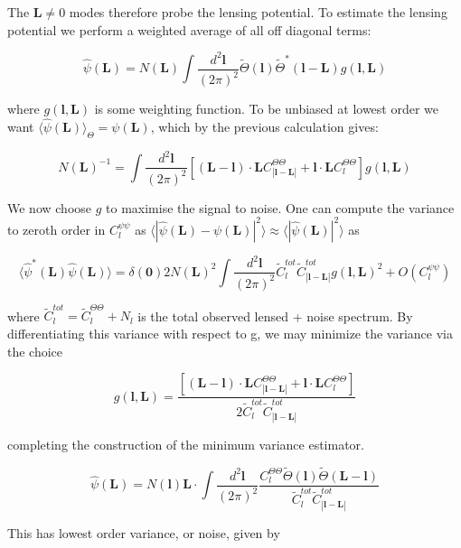 \documentclass[a4paper,10pt]{article}
\renewcommand{\v}[1]{\mathbf{#1}}
\newcommand{\finttwo}[1]{\int \frac{d^2 \v{#1}}{(2\pi)^2}}
\begin{document}
The $\v{L}\neq 0 $ modes therefore probe the lensing potential. To estimate the lensing potential we perform a weighted average of all off diagonal terms:

\begin{equation}
\hat{\psi}(\v{L}) = N(\v{L})\finttwo{l} \tilde{\Theta}(\v{l})\tilde{\Theta}^*(\v{l-L})g(\v{l},\v{L})
\end{equation}

where $g(\v{l},\v{L})$ is some weighting function. To be unbiased at lowest order we want $\langle \hat{\psi}(\v{L}) \rangle_\Theta = \psi(\v{L})$, which by the previous calculation gives:

\begin{equation}
N(\v{L})^{-1} = \finttwo{l} [(\v{L}-\v{l})\cdot\v{L}C^{\Theta\Theta}_{|\v{l}-\v{L}|}+\v{l}\cdot\v{L}C_l^{\Theta\Theta}]g(\v{l},\v{L})
\end{equation}

We now choose $g$ to maximise the signal to noise. One can compute the variance to zeroth order in $C_l^{\psi\psi}$ as $\langle| \hat{\psi}(\v{L})-\psi(\v{L})|^2 \rangle \approx 
\langle| \hat{\psi}(\v{L})|^2 \rangle$ as

\begin{equation}
\langle\hat{\psi}^*(\v{L}) \hat{\psi}(\v{L}) \rangle = \delta(\v{0})2N(\v{L})^2\finttwo{l}\tilde{C}_l^{tot}\tilde{C}_{|\v{l}-\v{L}|}^{tot}g(\v{l},\v{L})^2 + O(C_l^{\psi\psi})
\end{equation}

where $\tilde{C}_l^{tot} = \tilde{C}_l^{\Theta\Theta} + N_l$ is the total observed lensed + noise spectrum. By differentiating this variance with respect to g, we may minimize the variance via the choice

\begin{equation}
g(\v{l},\v{L}) = \frac{[(\v{L}-\v{l})\cdot\v{L}C^{\Theta\Theta}_{|\v{l}-\v{L}|}+\v{l}\cdot\v{L}C_l^{\Theta\Theta}]}{2\tilde{C}_l^{tot}\tilde{C}_{|\v{l}-\v{L}|}^{tot}}
\end{equation}

completing the construction of the minimum variance estimator. 

\begin{equation}
\hat{\psi}(\v{L}) = N(\v{l})\v{L}\cdot\finttwo{l} \frac{C_l^{\Theta\Theta}\tilde{\Theta}(\v{l})\tilde{\Theta}(\v{L-l})}{\tilde{C}_l^{tot}\tilde{C}_{|\v{l}-\v{L}|}^{tot}}
\end{equation}


This has lowest order variance, or noise, given by
\end{document}
